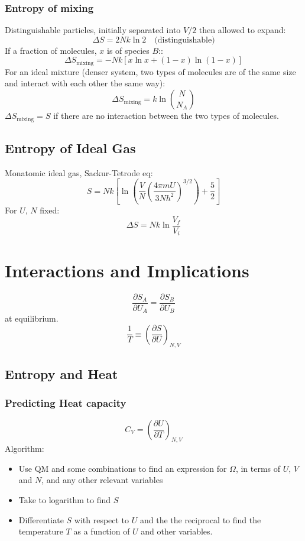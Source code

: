 \documentclass[a4paper,norsk, 10pt]{article}
\begin{document}
\subsubsection*{Entropy of mixing}
Distinguishable particles, initially separated into $V/2$ then allowed to expand:
\begin{equation}
\Delta S=2Nk\ln 2 \quad  (\mathrm{distinguishable)}
\end{equation}
If a fraction of molecules, $x$ is of species $B$::
\begin{equation}
\Delta S_{\mathrm{mixing}}=-Nk\left[x\ln x+(1-x)\ln (1-x)\right]
\end{equation}
For an ideal mixture (denser system, two types of molecules are of the same size and interact with each other the same way):
\begin{equation}
\Delta S_{\mathrm{mixing}}=k\ln {N\choose N_A}
\end{equation}
$\Delta S_{\mathrm{mixing}} = S$ if there are no interaction between the two types of molecules.
\subsection{Entropy of Ideal Gas}
Monatomic ideal gas, Sackur-Tetrode eq:
\begin{equation}
S = Nk\left[\ln\left(\frac{V}{N}\left(\frac{4\pi mU}{3Nh^2}\right)^{3/2}\right) + \frac{5}{2}\right]
\end{equation}
For $U$, $N$ fixed:
\begin{equation}
\Delta S = Nk\ln\frac{V_f}{V_i}
\end{equation}
\section{Interactions and Implications}
\begin{equation}
\frac{\partial S_A}{\partial U_A} = \frac{\partial S_B}{\partial U_B}
\end{equation}
at equilibrium.
\begin{equation}
\frac{1}{T}\equiv \left(\frac{\partial S}{\partial U}\right)_{N,V}
\end{equation}
\subsection{Entropy and Heat}
\subsubsection{Predicting Heat capacity}
\begin{equation}
C_V = \left(\frac{\partial U}{\partial T}\right)_{N,V}
\end{equation}
Algorithm:
\begin{itemize}
\item Use QM and some combinations to find an expression for $\Omega$, in terms of $U$, $V$ and $N$, and any other relevant variables
\item Take to logarithm to find $S$
\item Differentiate $S$ with respect to $U$ and the the reciprocal to find the temperature $T$ as a function of $U$ and other variables.
\end{itemize}
\end{document}
